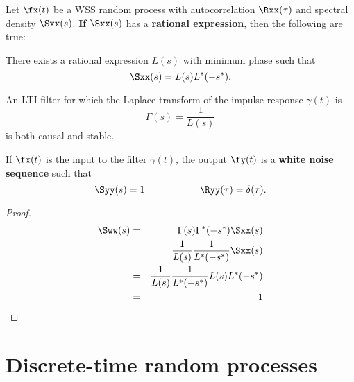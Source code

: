 \begin{theorem}
\label{thm:innovations}
Let $\fx(t)$ be a WSS random process with autocorrelation $\Rxx(\tau)$
and spectral density $\Sxx(s)$.
\textbf{If} $\Sxx(s)$ has a \textbf{rational expression},
then the following are true:
\begin{enume}
   \item There exists a rational expression $L(s)$ with minimum phase
         such that
         \[ \Sxx(s) = L(s)L^\ast(-s^\ast). \]
   \item An LTI filter for which the Laplace transform of
         the impulse response $\gamma(t)$ is
         \[ \Gamma(s) = \frac{1}{L(s)} \]
         is both causal and stable.
   \item If $\fx(t)$ is the input to the filter $\gamma(t)$,
         the output $\fy(t)$ is a \textbf{white noise sequence} such that
         \[ \Syy(s)=1 \hspace{2cm} \Ryy(\tau)=\delta(\tau).\]
\end{enume}
\end{theorem}

\begin{proof}
\begin{eqnarray*}
   \Sww(s)
     &=& \Gamma(s)\Gamma^\ast(-s^\ast) \Sxx(s)
   \\&=& \frac{1}{L(s)} \frac{1}{L^\ast(-s^\ast)} \Sxx(s)
   \\&=& \frac{1}{L(s)} \frac{1}{L^\ast(-s^\ast)} L(s) L^\ast(-s^\ast)
   \\&=& 1
\end{eqnarray*}
\end{proof}




\section{Discrete-time random processes}
